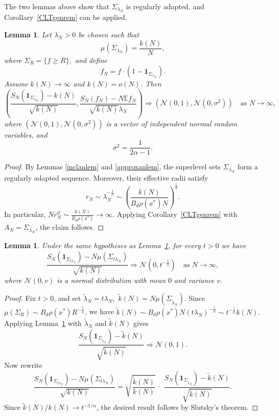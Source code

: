 \documentclass[11pt,twoside,a4paper,reqno]{amsart}
\newtheorem{lemma}[theorem]{Lemma}
\newcommand{\as}[1]{\text{as } #1 \rightarrow\infty}
\newcommand{\E}{\mathbb{E}}
\def\one{{\mathbf{1}}}
\begin{document}
The two lemmas above show that $\Sigma_{\lambda_N}$ is regularly adapted, and Corollary~\ref{CLTgenrem} can be applied.



\begin{lemma}\label{CLTlem}
Let $\lambda_N>0$ be chosen such that
$$
\mu(\Sigma_{\lambda_N})=\frac{k(N)}{N},
$$ where $\Sigma_R=\{f\ge R\},$
and define
$$f_N=f \cdot \left(1-\one_{\Sigma_{\lambda_N}} \right).$$
Assume $k(N)\to\infty$ and $k(N)=o(N)$. Then
\begin{equation}\label{normalclaim}
\left( \frac{S_N(\one_{\Sigma_{\lambda_N}}) - k(N)}{\sqrt{k(N)}}, \frac{S_N(f_N) - N \E f_N}{\sqrt{k(N)} \lambda_N} \right) \Rightarrow (\mathcal{N}(0,1), \mathcal{N}(0,\sigma^2)) \quad \as{N},
\end{equation}
where $(\mathcal{N}(0,1), \mathcal{N}(0,\sigma^2))$ is a vector of independent normal random variables, and
\begin{equation*}
\sigma^2= \frac{1}{2\alpha-1}.
\end{equation*}
\end{lemma}
\begin{proof}
By Lemmas \ref{inclanlem} and \ref{approxanlem}, the superlevel sets $\Sigma_{\lambda_N}$ form a regularly adapted sequence. Moreover, their effective radii satisfy
$$r_N\sim \lambda_N^{-\frac{1}{\beta}}\sim\left(\frac{k(N)}{B_d\rho(x^*)N}\right)^{\frac{1}{d}}.$$
In particular, $Nr_N^d\sim \frac{k(N)}{B_d\rho(x^*)}\to\infty.$ Applying Corollary~\ref{CLTgenrem} with $A_N=\Sigma_{\lambda_N}$, the claim follows.


\end{proof}




\begin{lemma}\label{normallem}
Under the same hypotheses as Lemma~\ref{CLTlem}, for every $t>0$ we have
\begin{equation*}
\frac{S_N(\one_{\Sigma_{t \lambda_N}}) - N \mu(\Sigma_{t \lambda_N})}{\sqrt{k(N)}} \Rightarrow \mathcal{N}(0,t^{-\frac{1}{\alpha}}) \quad \as{N},
\end{equation*}
where $\mathcal{N}(0,v)$ is a normal distribution with mean $0$ and variance $v$.
\end{lemma}
\begin{proof}
Fix $t>0$, and set $\tilde\lambda_N=t\lambda_N,$ $\tilde k(N)=N\mu(\Sigma_{\tilde\lambda_N}).$
Since $\mu(\Sigma_R)\sim B_d\rho(x^*)R^{-\frac{1}{\alpha}}$, we have
$\tilde k(N)\sim B_d\rho(x^*)N (t\lambda_N)^{-\frac{1}{\alpha}}\sim t^{-\frac{1}{\alpha}}k(N).$
Applying Lemma~\ref{CLTlem} with $\tilde\lambda_N$ and $\tilde k(N)$ gives
$$
\frac{S_N(\one_{\Sigma_{\tilde\lambda_N}})-\tilde k(N)}{\sqrt{\tilde k(N)}}
\Rightarrow \mathcal N(0,1).
$$
Now rewrite
$$
\frac{S_N(\mathbf{1}_{\Sigma_{t\lambda_N}})-N\mu(\Sigma_{t\lambda_N})}{\sqrt{k(N)}}
=\sqrt{\frac{\tilde{k}(N)}{k(N)}}\;\cdot\;\frac{S_N(\mathbf{1}_{\Sigma_{\tilde{\lambda}_N}})-\tilde{k}(N)}{\sqrt{\tilde{k}(N)}}.
$$
Since $\tilde k(N)/k(N)\to t^{-1/\alpha}$, the desired result follows by Slutsky's theorem.
\end{proof}
\end{document}
